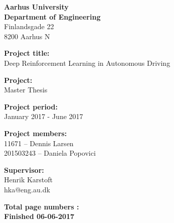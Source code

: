 \vspace*{1cm}

\begin{minipage}[t]{1\textwidth}

{\small 
\flushleft
\textbf{Aarhus University}\\
\textbf{Department of Engineering}  \\
Finlandsgade 22 \\
8200 Aarhus N \\
}

\vspace*{1cm}

\textbf{Project title:} \\[5pt]\bigskip\hspace{2ex}
Deep Reinforcement Learning in Autonomous Driving

\textbf{Project:} \\[5pt]\bigskip\hspace{2ex}
Master Thesis

\textbf{Project period:} \\[5pt]\bigskip\hspace{2ex}
January 2017 - June 2017

\textbf{Project members:} \\[5pt]\hspace*{2ex}
11671 	  -- Dennis Larsen \\\hspace*{2ex}
201503243 -- Daniela Popovici \\\hspace*{2ex}

\textbf{Supervisor:} \\[5pt]\hspace*{2ex}
Henrik Karstoft \\\bigskip\hspace{2ex}
hka@eng.au.dk

\vspace*{1cm}

\textbf{Total page numbers : \pageref{LastPage}} \\
\textbf{Finished 06-06-2017}


\end{minipage}
\hfill
\vfill

